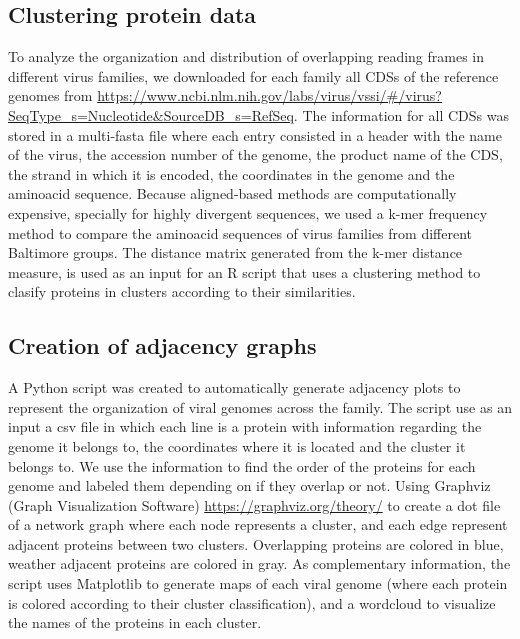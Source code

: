 \documentclass[12pt]{article}
\begin{document}
\subsection{Clustering protein data}
To analyze the organization and distribution of overlapping reading frames in different virus families, we downloaded for each family all CDSs of the reference genomes from \url{https://www.ncbi.nlm.nih.gov/labs/virus/vssi/#/virus?SeqType_s=Nucleotide&SourceDB_s=RefSeq}.
The information for all CDSs was stored in a multi-fasta file where each entry consisted in a header with the name of the virus, the accession number of the genome, the product name of the CDS, the strand in which it is encoded, the coordinates in the genome and the aminoacid sequence.
Because aligned-based methods are computationally expensive, specially for highly divergent sequences, we used a k-mer frequency method to compare the aminoacid sequences of virus families from different Baltimore groups.
The distance matrix generated from the k-mer distance measure, is used as an input for an R script that uses a clustering method to clasify proteins in clusters according to their similarities. 

\subsection{Creation of adjacency graphs}
A Python script was created to automatically generate adjacency plots to represent the organization of viral genomes across the family. 
The script use as an input a csv file in which each line is a protein with information regarding the genome it belongs to, the coordinates where it is located and the cluster it belongs to. 
We use the information to find the order of the proteins for each genome and labeled them depending on if they overlap or not. 
Using Graphviz (Graph Visualization Software) \url{https://graphviz.org/theory/} to create a dot file of a network graph where each node represents a cluster, and each edge represent adjacent proteins between two clusters.
Overlapping proteins are colored in blue, weather adjacent proteins are colored in gray. 
As complementary information, the script uses Matplotlib\cite{Hunter:2007} to generate maps of each viral genome (where each protein is colored according to their cluster classification), and a wordcloud to visualize the names of the proteins in each cluster.



\newpage


\end{document}
